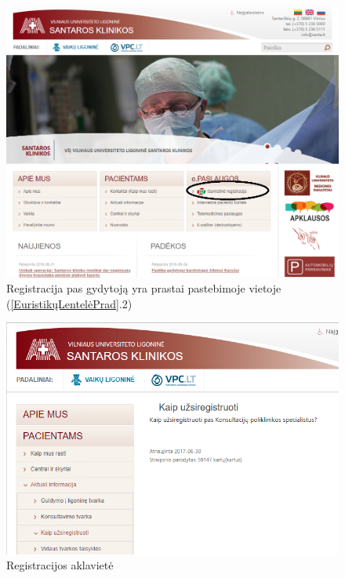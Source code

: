 \documentclass{VUMIFPSkursinis}
\begin{document}
\begin{figure}[H]
    \centering
    \includegraphics[scale=0.6]{img/RegistracijaPagrindinis}
    \caption{Registracija pas gydytoją yra prastai pastebimoje vietoje (\ref{EuristikųLentelėPrad}.2)}
    \label{img:RegistracijaPagrindinis}
\end{figure}

\begin{figure}[H]
    \centering
    \includegraphics[scale=0.8]{img/RegistracijosAklavietė}
    \caption{Registracijos aklavietė}
    \label{img:registracija}
\end{figure}
\end{document}

